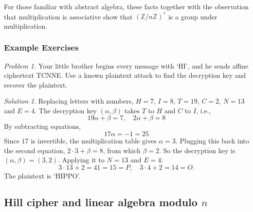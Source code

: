 \documentclass{article}
\theoremstyle{plain}
\theoremstyle{definition}
\theoremstyle{remark}
\newtheorem*{solution}{Solution}
\numberwithin{theorem}{section}
\newcommand{\ZZ}{\mathbb{Z}}
\begin{document}
For those familiar with abstract algebra, these facts together with the observation that multiplication is associative show that $(\ZZ/n\ZZ)^*$ is a group under multiplication.



\subsubsection{Example Exercises}

\emph{Problem 1.}
Your little brother begins every message with `HI', and he sends affine ciphertext TCNNE.  Use a known plaintext attack to find the decryption key and recover the plaintext.

\begin{solution}
Replacing letters with numbers, $H = 7$, $I = 8$, $T = 19$, $C = 2$, $N = 13$ and $E = 4$.  The decryption key $(\alpha,\beta)$ takes $T$ to $H$ and $C$ to $I$, i.e.,
\[
	19 \alpha + \beta = 7, \quad 2 \alpha + \beta = 8
\]
By subtracting equations,
\[
	17 \alpha = -1 = 25
\]
Since $17$ is invertible, the multiplication table gives $\alpha = 3$.  Plugging this back into the second equation, $2 \cdot 3 + \beta = 8$, from which $\beta = 2$.  So the decryption key is $(\alpha, \beta) = (3,2)$.  Applying it to $N = 13$ and $E = 4$:
\[
	3 \cdot 13 + 2 = 41 = 15 = P, \quad 3 \cdot 4 + 2 = 14 = O.
\]
The plaintext is `HIPPO'.
\end{solution}

\subsection{Hill cipher and linear algebra modulo $n$}
\label{sec:hill}
\end{document}
